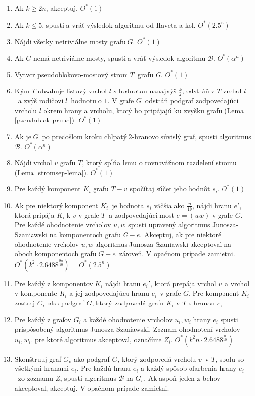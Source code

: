 \begin{enumerate}
    \item Ak $k \ge 2n$, akceptuj. $O^*(1)$
    \item Ak $k \leq 5$, spusti a vráť výsledok algoritmu od Haveta a kol. $O^*(2.5^n)$
    \item Nájdi všetky netriviálne mosty grafu $G$. $O^*(1)$
    \item Ak $G$ nemá netriviálne mosty, spusti a vráť výsledok algoritmu $\mathcal{B}$. $O^*(\alpha^n)$
    \item Vytvor pseudoblokovo-mostový strom $T$ grafu $G$. $O^*(1)$
    \item Kým $T$ obsahuje listový vrchol $l$ s hodnotou nanajvýš $\frac{k}{2}$, odstráň
          z $T$ vrchol $l$ a zvýš rodičovi $l$ hodnotu o $1$. V grafe $G$ odstráň podgraf
          zodpovedajúci vrcholu $l$ okrem hrany a vrcholu, ktorý ho pripájajú ku zvyšku grafu (Lema \ref{pseudoblok-prune}). $O^*(1)$
    \item Ak je $G$ po predošlom kroku chlpatý $2$-hranovo súvislý graf, spusti algoritmus $\mathcal{B}$. $O^*(\alpha^n)$
    \item Nájdi vrchol $v$ grafu $T$, ktorý
          spĺňa lemu o rovnovážnom rozdelení stromu (Lema \ref{stromsep-lema}). $O^*(1)$
    \item Pre každý komponent $K_i$ grafu $T - v$ spočítaj súčet jeho hodnôt $s_i$. $O^*(1)$
    \item Ak pre niektorý komponent $K_i$ je hodnota $s_i$ väčšia ako $\frac{n}{10}$,
          nájdi hranu $e'$, ktorá pripája $K_i$ k $v$ v grafe $T$ a zodpovedajúci most
          $e = (uw)$ v grafe $G$. Pre každé ohodnotenie vrcholov $u, w$ spusti upravený
          algoritmus Junosza-Szaniawski na komponentoch grafu $G - e$. Akceptuj, ak pre
          niektoré ohodnotenie vrcholov $u, w$ algoritmus Junosza-Szaniawski akceptoval
          na oboch komponentoch grafu $G-e$ zároveň. V opačnom prípade zamietni. $O^*(k^2 \cdot 2.6488^{\frac{9n}{10}}) = O^*(2.5^n)$
    \item Pre každý z komponentov $K_i$ nájdi hranu $e_i'$, ktorá prepája vrchol $v$ a vrchol
          v komponente $K_i$ a jej zodpovedajúcu hranu $e_i$ v grafe $G$. Pre komponent $K_i$ zostroj
          $G_i$ ako podgraf $G$, ktorý zodpovedá grafu $K_i$ v $T$ s hranou $e_i$. 
    \item Pre každý z grafov $G_i$ a každé ohodnotenie vrcholov $u_i, w_i$ hrany $e_i$ spusti
          prispôsobený algoritmus Junosza-Szaniawski. Zoznam ohodnotení vrcholov $u_i, w_i$,
          pre ktoré algoritmus akceptoval, označíme $Z_i$. $O^*(k^2n \cdot 2.6488^{\frac{n}{10}})$
    \item Skonštruuj graf $G_v$ ako podgraf $G$, ktorý zodpovedá vrcholu $v$ v $T$, spolu so
          všetkými hranami $e_i$. Pre každú hranu $e_i$ a každý spôsob ofarbenia hrany $e_i$ zo zoznamu $Z_i$
          spusti algoritmus $\mathcal{B}$ na $G_v$. Ak aspoň jeden z behov akceptoval, akceptuj.
          V opačnom prípade zamietni.
\end{enumerate}

